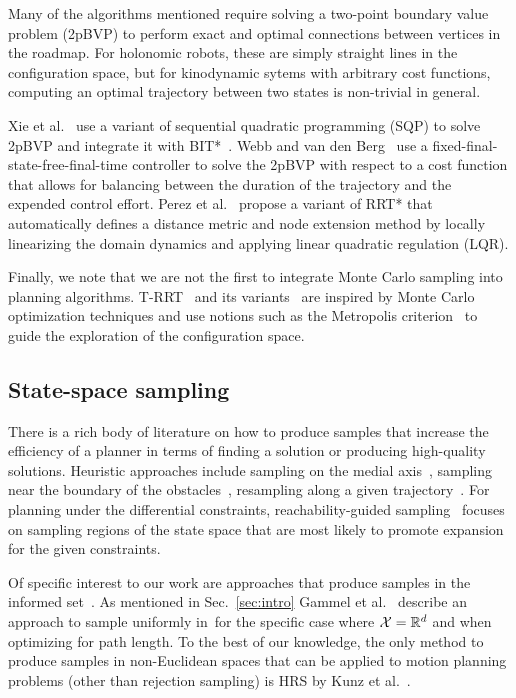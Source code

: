 \documentclass[letterpaper, 10 pt, conference]{ieeeconf}  %
\begin{document}
Many of the algorithms mentioned require solving a two-point boundary value problem (2pBVP) to perform exact and optimal connections between vertices in the roadmap.
For holonomic robots, these are simply straight lines in the configuration space, but for kinodynamic sytems with arbitrary cost functions,  computing an optimal trajectory between two states is non-trivial in general.

Xie et al.~\cite{XBPA15} use a variant of sequential quadratic programming (SQP) to solve 2pBVP and integrate it with BIT*~\cite{GSB15}.
Webb and van den Berg~\cite{WB13} use a fixed-final-state-free-final-time controller to solve the 2pBVP  with respect to a cost function that allows for balancing between the duration of the trajectory and the expended control effort.
Perez et al.~\cite{PPKKL12} propose a variant of RRT* that automatically defines a distance metric and node extension method by locally linearizing
the domain dynamics and applying linear quadratic regulation (LQR).

Finally, we note that we are not the first to integrate Monte Carlo sampling into planning algorithms. 
T-RRT~\cite{JCS10} and its variants~\cite{DSC13} are inspired by Monte Carlo optimization techniques and use notions such as the Metropolis criterion~\cite{CG95} to guide the exploration of the configuration space.


\subsection{State-space sampling}
\label{subsec:sampling}
There is a rich body of literature on how to produce samples that increase the efficiency of a planner in terms of finding a solution or producing high-quality solutions.
Heuristic approaches include
sampling on the medial axis~\cite{WAS99a, YDLTA14},
sampling near the boundary of the obstacles~\cite{YTEA12},
resampling along a given trajectory~\cite{AS11}.
For planning under the differential constraints,
reachability-guided sampling~\cite{PLAEFRA17} focuses on sampling regions of the state space that are most likely to promote expansion for the given constraints.


Of specific interest to our work are approaches that produce samples in the informed set~\Cinf.
As mentioned in Sec.~\ref{sec:intro} Gammel et al.~\cite{GSB14} describe an approach to sample uniformly in~\Cinf for the specific case where $\mathcal{X} = \mathbb{R}^d$ and when optimizing for path length.
To the best of our knowledge, the only method to produce samples in non-Euclidean spaces that can be  applied to motion planning problems (other than rejection sampling) is HRS by Kunz et al.~\cite{KTC16}.
\end{document}

